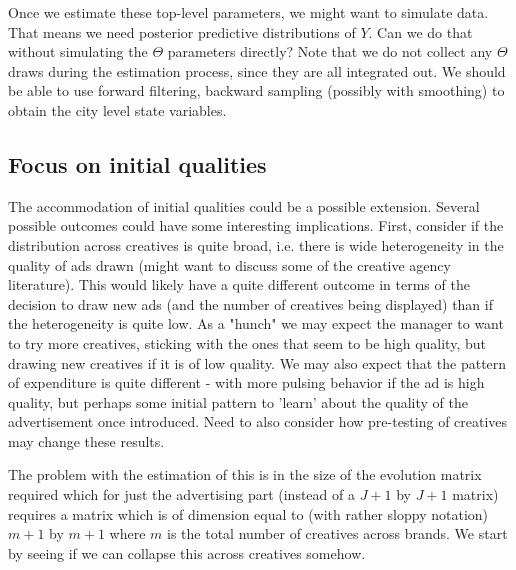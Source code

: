 \documentclass[letter,10pt]{article}
\begin{document}
Once we estimate these top-level parameters, we might want to simulate
data.  That means we need posterior predictive distributions of $Y$.
Can we do that without simulating the $\Theta$ parameters directly?
Note that we do not collect any $\Theta$ draws during the estimation
process, since they are all integrated out.  We should be able to use
forward filtering, backward sampling (possibly with smoothing) to obtain
the city level state variables.  


\subsection{Focus on initial qualities}
The accommodation of initial qualities could be a possible extension.   
Several possible outcomes could have some interesting implications.  First, 
consider if the distribution across creatives is quite broad, i.e. there is wide heterogeneity
in the quality of ads drawn (might want to discuss some of the creative agency literature). 
This would likely have a quite different outcome in terms of the decision to draw
new ads (and the number of creatives being displayed) than if the heterogeneity is
quite low.  As a "hunch" we may expect the manager to want to try more creatives, sticking
with the ones that seem to be high quality, but drawing new creatives if it is of low quality.
We may also expect that the pattern of expenditure is quite different - with more
pulsing behavior if the ad is high quality, but perhaps some initial pattern to 
'learn' about the quality of the advertisement once introduced.  Need to also consider
how pre-testing of creatives may change these results.  

The problem with the estimation of this is in the size of the evolution matrix required
which for just the advertising part (instead of a $J+1$ by $J+1$ matrix) requires a 
matrix which is of dimension equal to (with rather sloppy notation) $m+1$ by $m+1$ where $m$ is the total number of creatives across brands.   We start by seeing if we can 
collapse this across creatives somehow.  
\end{document}
